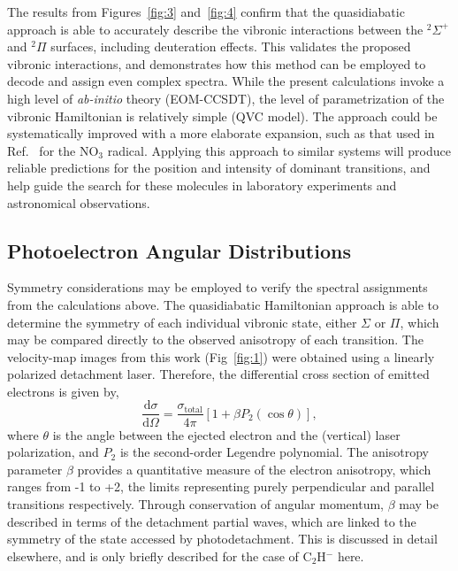 \documentclass[aip,graphicx]{revtex4-1}
\begin{document}
The results from Figures~\ref{fig:3} and~\ref{fig:4} confirm that the quasidiabatic approach is able to accurately describe the vibronic interactions between the $^2\Sigma^+$ and $^2\Pi$ surfaces, including deuteration effects. This validates the proposed vibronic interactions, and demonstrates how this method can be employed to decode and assign even complex spectra. While the present calculations invoke a high level of \emph{ab-initio} theory (EOM-CCSDT), the level of parametrization of the vibronic Hamiltonian is relatively simple (QVC model). The approach could be systematically improved with a more elaborate expansion, such as that used in Ref.~ for the NO$_3$ radical. Applying this approach to similar systems will produce reliable predictions for the position and intensity of dominant transitions, and help guide the search for these molecules in laboratory experiments and astronomical observations. 



\subsection{Photoelectron Angular Distributions}
Symmetry considerations may be employed to verify the spectral assignments from the calculations above. The quasidiabatic Hamiltonian approach is able to determine the symmetry of each individual vibronic state, either $\Sigma$ or $\Pi$, which may be compared directly to the observed anisotropy of each transition. The velocity-map images from this work (Fig~\ref{fig:1}) were obtained using a linearly polarized detachment laser. Therefore, the differential cross section of emitted electrons is given by,  
\begin{equation}
\frac{\text{d}\sigma}{\text{d}\Omega}=\frac{\sigma_{\text{total}}}{4\pi}[1+\beta P_{2}(\cos\theta)],
\label{eq:beta1}
\end{equation}
where $\theta$ is the angle between the ejected electron and the (vertical) 
laser polarization, and $P_2$ is the second-order Legendre polynomial. The anisotropy parameter $\beta$ provides a quantitative measure of the electron anisotropy, which ranges from -1 to +2, the limits representing purely perpendicular and parallel transitions respectively. Through conservation of angular momentum, $\beta$ may be described in terms of the detachment partial waves, which are linked to the symmetry of the state accessed by photodetachment. This is discussed in detail elsewhere\cite{khu14,law19}, and is only briefly described for the case of C$_2$H$^-$ here. 
\end{document}

